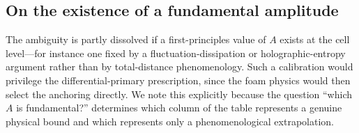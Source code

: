\documentclass[aps,prd,onecolumn,amsmath,amssymb]{revtex4-2}
\begin{document}
\subsection{On the existence of a fundamental amplitude}

The ambiguity is partly dissolved if a first-principles value of $A$ exists at
the cell level---for instance one fixed by a fluctuation-dissipation or
holographic-entropy argument rather than by total-distance phenomenology. Such
a calibration would privilege the differential-primary prescription, since the
foam physics would then select the anchoring directly. We note this explicitly
because the question ``which $A$ is fundamental?'' determines which column of
the table represents a genuine physical bound and which represents only a
phenomenological extrapolation.
\end{document}
